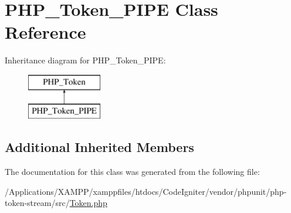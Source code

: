 \hypertarget{class_p_h_p___token___p_i_p_e}{}\section{P\+H\+P\+\_\+\+Token\+\_\+\+P\+I\+PE Class Reference}
\label{class_p_h_p___token___p_i_p_e}
Inheritance diagram for P\+H\+P\+\_\+\+Token\+\_\+\+P\+I\+PE\+:\begin{figure}[H]
\begin{center}
\leavevmode
\includegraphics[height=2.000000cm]{class_p_h_p___token___p_i_p_e}
\end{center}
\end{figure}
\subsection*{Additional Inherited Members}


The documentation for this class was generated from the following file\+:\begin{DoxyCompactItemize}
\item 
/\+Applications/\+X\+A\+M\+P\+P/xamppfiles/htdocs/\+Code\+Igniter/vendor/phpunit/php-\/token-\/stream/src/\mbox{\hyperlink{_token_8php}{Token.\+php}}\end{DoxyCompactItemize}
